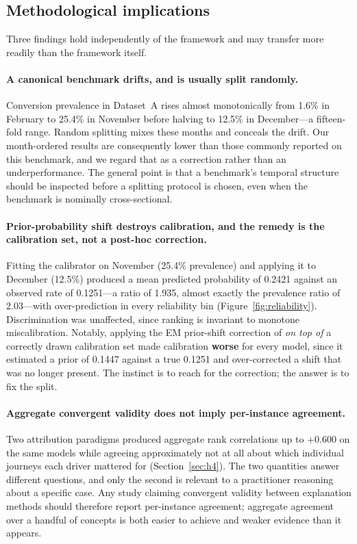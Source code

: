 \documentclass[review,3p,times,authoryear]{elsarticle}   %
\begin{document}
\subsection{Methodological implications}

Three findings hold independently of the framework and may transfer more readily
than the framework itself.

\paragraph{A canonical benchmark drifts, and is usually split randomly.}
Conversion prevalence in Dataset~A rises almost monotonically from 1.6\% in February
to 25.4\% in November before halving to 12.5\% in December---a fifteen-fold range.
Random splitting mixes these months and conceals the drift. Our month-ordered
results are consequently lower than those commonly reported on this benchmark, and
we regard that as a correction rather than an underperformance. The general point is
that a benchmark's temporal structure should be inspected before a splitting
protocol is chosen, even when the benchmark is nominally cross-sectional.

\paragraph{Prior-probability shift destroys calibration, and the remedy is the
calibration set, not a post-hoc correction.}
Fitting the calibrator on November (25.4\% prevalence) and applying it to December
(12.5\%) produced a mean predicted probability of 0.2421 against an observed rate of
0.1251---a ratio of 1.935, almost exactly the prevalence ratio of 2.03---with
over-prediction in every reliability bin (Figure~\ref{fig:reliability}).
Discrimination was unaffected, since ranking is invariant to monotone
miscalibration. Notably, applying the EM prior-shift correction of
\citet{saerens2002adjusting} \emph{on top of} a correctly drawn calibration set made
calibration \textbf{worse} for every model, since it estimated a prior of 0.1447
against a true 0.1251 and over-corrected a shift that was no longer present. The
instinct is to reach for the correction; the answer is to fix the split.

\paragraph{Aggregate convergent validity does not imply per-instance agreement.}
Two attribution paradigms produced aggregate rank correlations up to $+0.600$ on the
same models while agreeing approximately not at all about which individual journeys
each driver mattered for (Section~\ref{sec:h4}). The two quantities answer different
questions, and only the second is relevant to a practitioner reasoning about a
specific case. Any study claiming convergent validity between explanation methods
should therefore report per-instance agreement; aggregate agreement over a handful
of concepts is both easier to achieve and weaker evidence than it appears.
\end{document}
